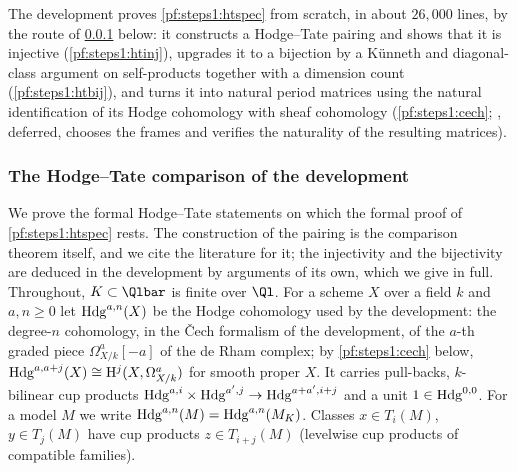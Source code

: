 \begin{remark}\label{pf:steps1:htspecrem}
The development proves \cref{pf:steps1:htspec} from scratch, in about $26{,}000$ lines, by the route of
\cref{sec:pf:steps1:htdev} below: it constructs a Hodge--Tate pairing and shows that it is injective
(\cref{pf:steps1:htinj}), upgrades it to a bijection by a K\"unneth and diagonal-class argument on self-products together
with a dimension count (\cref{pf:steps1:htbij}), and turns it into natural period matrices using the natural
identification of its Hodge cohomology with sheaf cohomology (\cref{pf:steps1:cech};
, deferred, chooses the frames and verifies the naturality of the
resulting matrices).
\end{remark}

\subsubsection{The Hodge--Tate comparison of the development}\label{sec:pf:steps1:htdev}

We prove the formal Hodge--Tate statements on which the formal proof of \cref{pf:steps1:htspec} rests. The construction of
the pairing is the comparison theorem itself, and we cite the literature for it; the injectivity and the bijectivity are
deduced in the development by arguments of its own, which we give in full. Throughout, $K\subset\Qlbar$ is finite over
$\Ql$. For a scheme $X$ over a field $k$ and $a,n\ge0$ let $\mathrm{Hdg}^{a,n}(X)$ be the Hodge cohomology used by the
development: the degree-$n$ cohomology, in the \v{C}ech formalism of the development, of the $a$-th graded piece
$\Omega^a_{X/k}[-a]$ of the de Rham complex; by \cref{pf:steps1:cech} below, $\mathrm{Hdg}^{a,a+j}(X)\cong
\mathrm{H}^j(X,\Omega^a_{X/k})$ for smooth proper $X$. It carries pull-backs, $k$-bilinear cup products
$\mathrm{Hdg}^{a,i}\times\mathrm{Hdg}^{a',j}\to\mathrm{Hdg}^{a+a',i+j}$ and a unit $1\in\mathrm{Hdg}^{0,0}$. For a model $M$ we
write $\mathrm{Hdg}^{a,n}(M)=\mathrm{Hdg}^{a,n}(M_K)$. Classes $x\in T_i(M)$, $y\in T_j(M)$ have cup products $z\in
T_{i+j}(M)$ (levelwise cup products of compatible families).

